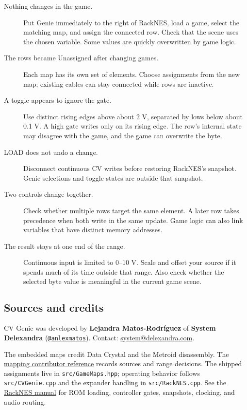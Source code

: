 \begin{description}
\item[Nothing changes in the game.]
Put Genie immediately to the right of RackNES, load a game, select the
matching map, and assign the connected row. Check that the scene uses the
chosen variable. Some values are quickly overwritten by game logic.
\item[The rows became Unassigned after changing games.]
Each map has its own set of elements. Choose assignments from the new map;
existing cables can stay connected while rows are inactive.
\item[A toggle appears to ignore the gate.]
Use distinct rising edges above about 2 V, separated by lows below about
0.1 V. A high gate writes only on its rising edge. The row's internal state
may disagree with the game, and the game can overwrite the byte.
\item[LOAD does not undo a change.]
Disconnect continuous CV writes before restoring RackNES's snapshot. Genie
selections and toggle states are outside that snapshot.
\item[Two controls change together.]
Check whether multiple rows target the same element. A later row takes
precedence when both write in the same update. Game logic can also link
variables that have distinct memory addresses.
\item[The result stays at one end of the range.]
Continuous input is limited to 0--10 V. Scale and offset your source if it
spends much of its time outside that range. Also check whether the selected
byte value is meaningful in the current game scene.
\end{description}

\subsection{Sources and credits}
CV Genie was developed by \textbf{Lejandra Matos-Rodr\'iguez} of
\textbf{System Delexandra}
(\href{https://github.com/anlexmatos}{\texttt{@anlexmatos}}).
Contact: \href{mailto:system@delexandra.com}{system@delexandra.com}.

The embedded maps credit Data Crystal and the Metroid disassembly. The
\href{https://github.com/Arhythmetic-Units/RackNES/blob/master/docs/game-maps.md}{mapping contributor reference}
records sources and range decisions. The shipped assignments live in
\texttt{src/GameMaps.hpp}; operating behavior follows \texttt{src/CVGenie.cpp}
and the expander handling in \texttt{src/RackNES.cpp}.
See the \href{https://github.com/Arhythmetic-Units/RackNES/releases/latest/download/RackNES.pdf}{RackNES manual}
for ROM loading, controller gates, snapshots, clocking, and audio routing.
